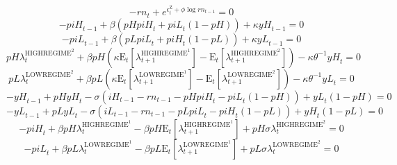 \begin{equation}
-{r\!n}_{t} + e^{\epsilon^{\mathrm{Z}}_{t} + {\phi} {\log{{r\!n}_{t-1}}}} = 0
\end{equation}
\begin{equation}
-{p\!i\!H}_{t-1} + {\beta} \left({{p\!H}} {{p\!i\!H}_{t}} + {{p\!i\!L}_{t}} \left(1 - {p\!H}\right)\right) + {\kappa} {{y\!H}_{t-1}} = 0
\end{equation}
\begin{equation}
-{p\!i\!L}_{t-1} + {\beta} \left({{p\!L}} {{p\!i\!L}_{t}} + {{p\!i\!H}_{t}} \left(1 - {p\!L}\right)\right) + {\kappa} {{y\!L}_{t-1}} = 0
\end{equation}
\begin{equation}
{{p\!H}} {\lambda^{\mathrm{HIGHREGIME}^{\mathrm{2}}}_{t}} + {\beta} {{p\!H}} \left({\kappa} {\mathrm{E}_{t}\left[\lambda^{\mathrm{HIGHREGIME}^{\mathrm{1}}}_{t+1}\right]} - \mathrm{E}_{t}\left[\lambda^{\mathrm{HIGHREGIME}^{\mathrm{2}}}_{t+1}\right]\right) - {\kappa} {\theta}^{-1} {{y\!H}_{t}} = 0
\end{equation}
\begin{equation}
{{p\!L}} {\lambda^{\mathrm{LOWREGIME}^{\mathrm{2}}}_{t}} + {\beta} {{p\!L}} \left({\kappa} {\mathrm{E}_{t}\left[\lambda^{\mathrm{LOWREGIME}^{\mathrm{1}}}_{t+1}\right]} - \mathrm{E}_{t}\left[\lambda^{\mathrm{LOWREGIME}^{\mathrm{2}}}_{t+1}\right]\right) - {\kappa} {\theta}^{-1} {{y\!L}_{t}} = 0
\end{equation}
\begin{equation}
-{y\!H}_{t-1} + {{p\!H}} {{y\!H}_{t}} - {\sigma} \left({i\!H}_{t-1} - {r\!n}_{t-1} - {{p\!H}} {{p\!i\!H}_{t}} - {{p\!i\!L}_{t}} \left(1 - {p\!H}\right)\right) + {{y\!L}_{t}} \left(1 - {p\!H}\right) = 0
\end{equation}
\begin{equation}
-{y\!L}_{t-1} + {{p\!L}} {{y\!L}_{t}} - {\sigma} \left({i\!L}_{t-1} - {r\!n}_{t-1} - {{p\!L}} {{p\!i\!L}_{t}} - {{p\!i\!H}_{t}} \left(1 - {p\!L}\right)\right) + {{y\!H}_{t}} \left(1 - {p\!L}\right) = 0
\end{equation}
\begin{equation}
-{p\!i\!H}_{t} + {\beta} {{p\!H}} {\lambda^{\mathrm{HIGHREGIME}^{\mathrm{1}}}_{t}} - {\beta} {{p\!H}} {\mathrm{E}_{t}\left[\lambda^{\mathrm{HIGHREGIME}^{\mathrm{1}}}_{t+1}\right]} + {{p\!H}} {\sigma} {\lambda^{\mathrm{HIGHREGIME}^{\mathrm{2}}}_{t}} = 0
\end{equation}
\begin{equation}
-{p\!i\!L}_{t} + {\beta} {{p\!L}} {\lambda^{\mathrm{LOWREGIME}^{\mathrm{1}}}_{t}} - {\beta} {{p\!L}} {\mathrm{E}_{t}\left[\lambda^{\mathrm{LOWREGIME}^{\mathrm{1}}}_{t+1}\right]} + {{p\!L}} {\sigma} {\lambda^{\mathrm{LOWREGIME}^{\mathrm{2}}}_{t}} = 0
\end{equation}
